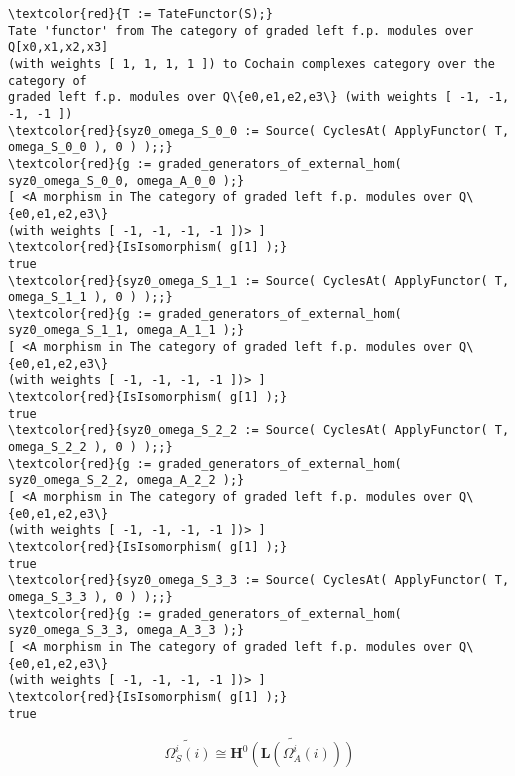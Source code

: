 \documentclass[16pt,a4paper]{extarticle}
\theoremstyle{definition}
\begin{document}
\begin{Verbatim}[commandchars=\\\{\}]
\textcolor{red}{T := TateFunctor(S);}
Tate 'functor' from The category of graded left f.p. modules over Q[x0,x1,x2,x3]
(with weights [ 1, 1, 1, 1 ]) to Cochain complexes category over the category of
graded left f.p. modules over Q\{e0,e1,e2,e3\} (with weights [ -1, -1, -1, -1 ])
\textcolor{red}{syz0_omega_S_0_0 := Source( CyclesAt( ApplyFunctor( T, omega_S_0_0 ), 0 ) );;}
\textcolor{red}{g := graded_generators_of_external_hom( syz0_omega_S_0_0, omega_A_0_0 );}
[ <A morphism in The category of graded left f.p. modules over Q\{e0,e1,e2,e3\} 
(with weights [ -1, -1, -1, -1 ])> ]
\textcolor{red}{IsIsomorphism( g[1] );}
true
\textcolor{red}{syz0_omega_S_1_1 := Source( CyclesAt( ApplyFunctor( T, omega_S_1_1 ), 0 ) );;}
\textcolor{red}{g := graded_generators_of_external_hom( syz0_omega_S_1_1, omega_A_1_1 );}
[ <A morphism in The category of graded left f.p. modules over Q\{e0,e1,e2,e3\} 
(with weights [ -1, -1, -1, -1 ])> ]
\textcolor{red}{IsIsomorphism( g[1] );}
true
\textcolor{red}{syz0_omega_S_2_2 := Source( CyclesAt( ApplyFunctor( T, omega_S_2_2 ), 0 ) );;}
\textcolor{red}{g := graded_generators_of_external_hom( syz0_omega_S_2_2, omega_A_2_2 );}
[ <A morphism in The category of graded left f.p. modules over Q\{e0,e1,e2,e3\} 
(with weights [ -1, -1, -1, -1 ])> ]
\textcolor{red}{IsIsomorphism( g[1] );}
true
\textcolor{red}{syz0_omega_S_3_3 := Source( CyclesAt( ApplyFunctor( T, omega_S_3_3 ), 0 ) );;}
\textcolor{red}{g := graded_generators_of_external_hom( syz0_omega_S_3_3, omega_A_3_3 );}
[ <A morphism in The category of graded left f.p. modules over Q\{e0,e1,e2,e3\} 
(with weights [ -1, -1, -1, -1 ])> ]
\textcolor{red}{IsIsomorphism( g[1] );}
true
\end{Verbatim}

$$\widetilde{\Omega^i_S(i)} \cong \widetilde{\mathbf{H}^0(\mathbf{L}( \Omega^i_A(i) ))}$$
\end{document}
